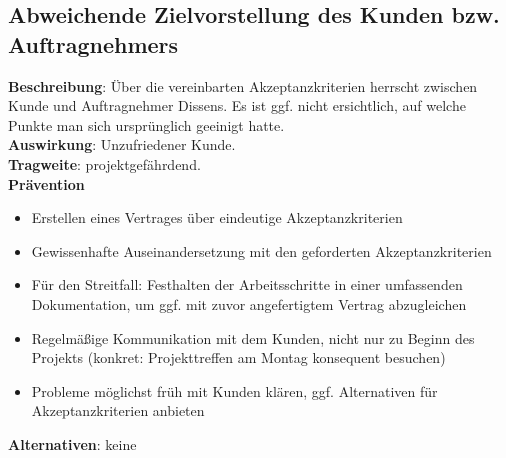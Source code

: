 \documentclass[a4paper, 12pt, titlepage]{scrartcl}
\begin{document}
	\subsection{Abweichende Zielvorstellung des Kunden bzw. Auftragnehmers}
		\textbf{Beschreibung}: \"Uber die vereinbarten Akzeptanzkriterien herrscht zwischen Kunde und Auftragnehmer Dissens. Es ist ggf. nicht ersichtlich, auf welche Punkte man sich urspr\"unglich geeinigt hatte.\\
		\textbf{Auswirkung}: Unzufriedener Kunde.\\
		\textbf{Tragweite}: projektgef\"ahrdend.\\
		\textbf{Pr\"avention}
			\begin{itemize}
				\item Erstellen eines Vertrages \"uber eindeutige Akzeptanzkriterien
				\item Gewissenhafte Auseinandersetzung mit den geforderten Akzeptanzkriterien
				\item F\"ur den Streitfall: Festhalten der Arbeitsschritte in einer umfassenden Dokumentation, um ggf. mit zuvor angefertigtem Vertrag abzugleichen
				\item Regelm\"a\ss ige Kommunikation mit dem Kunden, nicht nur zu Beginn des Projekts (konkret: Projekttreffen am Montag konsequent besuchen)
				\item Probleme m\"oglichst fr\"uh mit Kunden kl\"aren, ggf. Alternativen f\"ur Akzeptanzkriterien anbieten
			\end{itemize}
		\textbf{Alternativen}: keine

\
\end{document}
